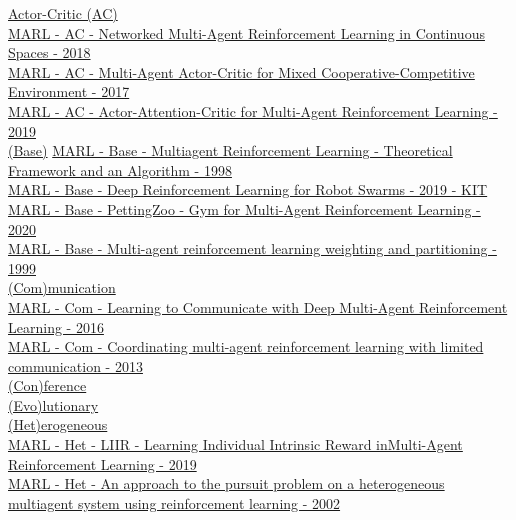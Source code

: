 \underline{Actor-Critic (AC)}
\\
\href{https://ieeexplore.ieee.org/abstract/document/8619581}{MARL - AC - Networked Multi-Agent Reinforcement Learning in Continuous Spaces - 2018}
\\
\href{https://arxiv.org/abs/1706.02275}{MARL - AC - Multi-Agent Actor-Critic for Mixed Cooperative-Competitive Environment - 2017}
\\
\href{http://proceedings.mlr.press/v97/iqbal19a.html}{MARL - AC - Actor-Attention-Critic for Multi-Agent Reinforcement Learning - 2019}
\\

\underline{(Base)}
\href{https://dl.acm.org/doi/abs/10.5555/645527.657296}{MARL - Base - Multiagent Reinforcement Learning - Theoretical Framework and an Algorithm - 1998}
\\
\href{https://publikationen.bibliothek.kit.edu/1000118251}{MARL - Base - Deep Reinforcement Learning for Robot Swarms - 2019 - KIT}
\\
\href{https://arxiv.org/abs/2009.14471}{MARL - Base - PettingZoo - Gym for Multi-Agent Reinforcement Learning - 2020}
\\
\href{https://www.sciencedirect.com/science/article/pii/S0893608099000246}{MARL - Base - Multi-agent reinforcement learning weighting and partitioning - 1999}
\\

\underline{(Com)munication}
\\
\href{https://arxiv.org/abs/1605.06676}{MARL - Com - Learning to Communicate with Deep Multi-Agent Reinforcement Learning - 2016}
\\
\href{https://dl.acm.org/doi/abs/10.5555/2484920.2485093}{MARL - Com - Coordinating multi-agent reinforcement learning with limited communication - 2013}
\\

\underline{(Con)ference}
\\

\underline{(Evo)lutionary}
\\

\underline{(Het)erogeneous}
\\
\href{https://proceedings.neurips.cc/paper/2019/hash/07a9d3fed4c5ea6b17e80258dee231fa-Abstract.html}{MARL - Het - LIIR - Learning Individual Intrinsic Reward inMulti-Agent Reinforcement Learning - 2019}
\\
\href{https://www.sciencedirect.com/science/article/abs/pii/S092188900300040X}{MARL - Het - An approach to the pursuit problem on a heterogeneous multiagent system using reinforcement learning - 2002}

